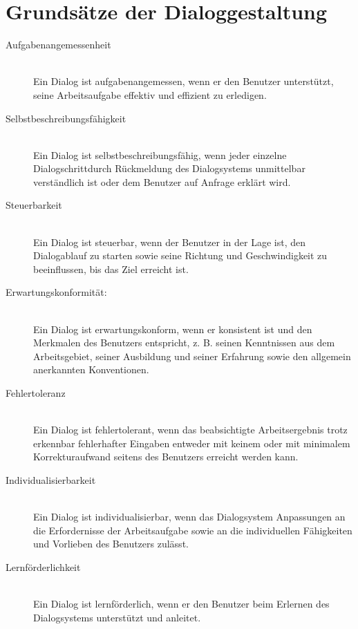 \documentclass[a4paper,10pt]{article}
\begin{document}
\section{Grunds\"atze der Dialoggestaltung}
\begin{description}
	\item[Aufgabenangemessenheit] \hfill \\
		Ein Dialog ist aufgabenangemessen, wenn er den Benutzer unterstützt, seine Arbeitsaufgabe effektiv und effizient zu erledigen.
	\item[Selbstbeschreibungsf\"ahigkeit] \hfill \\
		Ein Dialog ist selbstbeschreibungsf\"ahig, wenn jeder einzelne Dialogschrittdurch R\"uckmeldung des Dialogsystems unmittelbar verst\"andlich ist oder dem Benutzer auf Anfrage erklärt wird.	
	\item[Steuerbarkeit] \hfill \\
		Ein Dialog ist steuerbar, wenn der Benutzer in der Lage ist, den Dialogablauf zu
starten sowie seine Richtung und Geschwindigkeit zu beeinflussen, bis das Ziel erreicht ist.
	\item[Erwartungskonformit\"at:] \hfill \\
		Ein Dialog ist erwartungskonform, wenn er konsistent ist und den Merkmalen des
Benutzers entspricht, z. B. seinen Kenntnissen aus dem Arbeitsgebiet, seiner Ausbildung und seiner Erfahrung sowie den allgemein anerkannten Konventionen.
	\item[Fehlertoleranz] \hfill \\
		Ein Dialog ist fehlertolerant, wenn das beabsichtigte Arbeitsergebnis trotz
erkennbar fehlerhafter Eingaben entweder mit keinem oder mit minimalem Korrekturaufwand seitens des Benutzers erreicht werden kann.
	\item[Individualisierbarkeit] \hfill \\
		Ein Dialog ist individualisierbar, wenn das Dialogsystem Anpassungen an die
Erfordernisse der Arbeitsaufgabe sowie an die individuellen F\"ahigkeiten und Vorlieben des Benutzers zul\"asst.
	\item[Lernf\"orderlichkeit] \hfill \\
		Ein Dialog ist lernf\"orderlich, wenn er den Benutzer beim Erlernen des Dialogsystems unterst\"utzt und anleitet.
\end{description}
\end{document}
